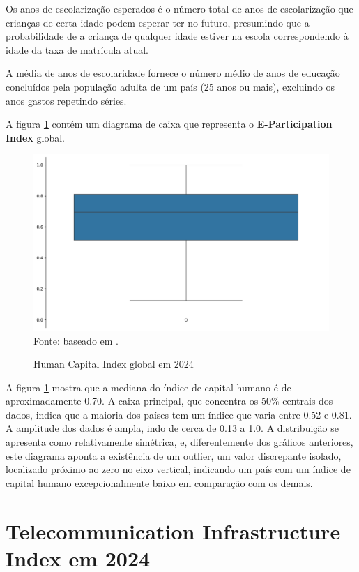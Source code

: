 Os anos de escolarização esperados é o número total de anos de escolarização que crianças de certa idade podem esperar ter no futuro, presumindo que a probabilidade de a criança de qualquer idade estiver na escola correspondendo à idade da taxa de matrícula atual.

A média de anos de escolaridade fornece o número médio de anos de educação concluídos pela população adulta de um país (25 anos ou mais), excluindo os anos gastos repetindo séries. 

A figura \ref{fig:boxplot_hci_global} contém um diagrama de caixa que representa o \textbf{E-Participation Index} global.

\begin{figure}[H]
	\centering
	\caption{Human Capital Index global em 2024}
	\includegraphics[width=1\linewidth]{figuras/egdi/boxplot_hci_global.png}
	\label{fig:boxplot_hci_global}
	\footnotesize{Fonte: baseado em \cite{ONU_EGDI_mapa}.}
\end{figure}

A figura \ref{fig:boxplot_hci_global} mostra que a mediana do índice de capital humano é de aproximadamente 0.70. A caixa principal, que concentra os 50\% centrais dos dados, indica que a maioria dos países tem um índice que varia entre 0.52 e 0.81. A amplitude dos dados é ampla, indo de cerca de 0.13 a 1.0. A distribuição se apresenta como relativamente simétrica, e, diferentemente dos gráficos anteriores, este diagrama aponta a existência de um outlier, um valor discrepante isolado, localizado próximo ao zero no eixo vertical, indicando um país com um índice de capital humano excepcionalmente baixo em comparação com os demais.

\section{Telecommunication Infrastructure Index em 2024}
\label{tii}


